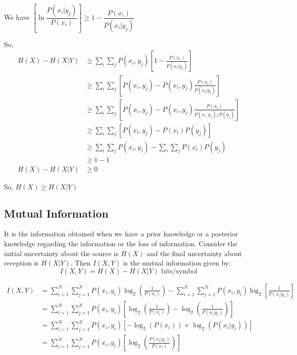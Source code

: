\documentclass[12pt]{article}
\begin{document}
We have $\left[ \ln \dfrac{P(x_i|y_j)}{P(x_i)} \right] \ge 1 - \dfrac{P(x_i)}{P(x_i|y_j)}$

So,
\begin{align*}
	H(X) - H(X|Y) & \ge \sum_i \sum_j P(x_i, y_j) \left[ 1 - \frac{P(x_i)}{P(x_i|y_j)} \right]                     \\
	              & \ge \sum_i \sum_j \left[ P(x_i, y_j) - P(x_i, y_j) \frac{P(x_i)}{P(x_i|y_j)} \right]           \\
	              & \ge \sum_i \sum_j \left[ P(x_i, y_j) - P(x_i, y_j) \frac{P(x_i)}{P(x_i, y_j) / P(y_j)} \right] \\
	              & \ge \sum_i \sum_j \left[ P(x_i, y_j) - P(x_i)P(y_j) \right]                                    \\
	              & \ge \sum_i \sum_j P(x_i, y_j) - \sum_i \sum_j P(x_i)P(y_j)                                     \\
	              & \ge 1 - 1                                                                                      \\
	H(X) - H(X|Y) & \ge 0
\end{align*}

So, $H(X) \ge H(X|Y)$

\subsection{Mutual Information}
It is the information obtained when we have a prior knowledge or a posterior knowledge regarding the information or the loss of information. Consider the initial uncertainty about the source is $H(X)$ and the final uncertainty about reception is $H(X|Y)$. Then $I(X,Y)$ is the mutual information given by:
$$I(X,Y) = H(X) - H(X|Y) \text{ bits/symbol}$$

\begin{align*}
	I(X,Y) & = \sum_{i=1}^{N} \sum_{j=1}^{N} P(x_i, y_i) \log_2 \left( \frac{1}{P(x_i)} \right) - \sum_{i=1}^{N} \sum_{j=1}^{N} P(x_i, y_i) \log_2 \left[ \frac{1}{P(x_i|y_i)} \right] \\
	       & = \sum_{i=1}^{N} \sum_{j=1}^{N} P(x_i, y_i) \left[ \log_2 \left( \frac{1}{P(x_i)} \right) - \log_2 \left( \frac{1}{P(x_i|y_i)} \right) \right]                            \\
	       & = \sum_{i=1}^{N} \sum_{j=1}^{N} P(x_i, y_i) \left[ -\log_2 (P(x_i)) + \log_2 (P(x_i|y_i)) \right]                                                                         \\
	       & = \sum_{i=1}^{N} \sum_{j=1}^{N} P(x_i, y_i) \left[ \log_2 \left( \frac{P(x_i|y_i)}{P(x_i)} \right) \right]
\end{align*}
\end{document}
